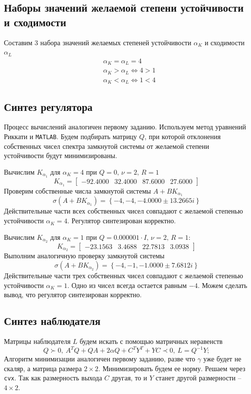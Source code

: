 \documentclass[a4paper, 12pt]{article}
\begin{document}
    \subsection{Наборы значений желаемой степени устойчивости и сходимости}
    Составим 3 набора значений желаемых степеней устойчивости $\alpha_K$ и сходимости $\alpha_L$
    \begin{align*}
        &\alpha_K=\alpha_L=4\\
        &\alpha_K>\alpha_L\Leftrightarrow 4>1\\
        &\alpha_K<\alpha_L\Leftrightarrow 1<4
    \end{align*}


    \subsection{Синтез регулятора}
    Процесс вычислений аналогичен первому заданию. Используем метод уравнений Риккати и \texttt{MATLAB}.
    Будем подбирать матрицу $Q$, при которой отклонения собственных чисел спектра замкнутой системы
    от желаемой степени устойчивости будут минимизированы.


    Вычислим $K_{\alpha_1}$ для $\alpha_K=4$ при $Q=0,\,\nu=2,\,R=1$
    $$
    K_{\alpha_1}=
    \begin{bmatrix}
        -92.4000   &32.4000   &87.6000   &27.6000
    \end{bmatrix}
    $$
    Проверим собственные числа замкнутой системы $A+BK_{\alpha_1}$
    $$
    \sigma\left( A+BK_{\alpha_1} \right)=\left\{ -4,-4,-4.0000\pm13.2665i \right\}
    $$
    Действительные части всех собственных чисел совпадают с желаемой степенью устойчивости $\alpha_K=4$.
    Регулятор синтезирован корректно.


    Вычислим $K_{\alpha_2}$ для $\alpha_K=1$ при $Q=0.000001\cdot I,\,\nu=2,\,R=1$:
    $$
    K_{\alpha_2}=
    \begin{bmatrix}
        -23.1563    &3.4688   &22.7813    &3.0938
    \end{bmatrix}
    $$
    Выполним аналогичную проверку замкнутой системы
    $$
    \sigma\left( A+BK_{\alpha_2} \right)=\left\{ -4,-1,-1.0000 \pm 7.6812i \right\}
    $$
    Действительные части трех собственных чисел совпадают с желаемой степенью устойчивости $\alpha_K=1$.
    Одно из чисел всегда остается равным $-4$. Можем сделать вывод, что регулятор синтезирован корректно.


    \subsection{Синтез наблюдателя}
    Матрицы наблюдателя $L$ будем искать с помощью матричных неравенств
    $$
    Q\succ0,\ A^TQ+QA+2\alpha Q+C^TY^T+YC\prec 0,\ L=Q^{-1}Y;
    $$
    Алгоритм минимизации аналогичен первому заданию, разве что $\gamma$ уже будет не скаляр,
    а матрица размера $2\times2$. Минимизировать будем ее норму. Решаем через \texttt{cvx}.
    Так как размерность выхода $C$ другая, то и $Y$ станет другой размерности -- $4\times2$.
\end{document}
